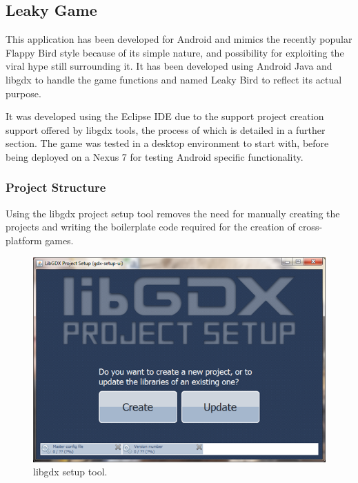 \newpage
\subsection{Leaky Game}
This application has been developed for Android and mimics the recently popular Flappy Bird style because of its simple nature, and possibility for exploiting the viral hype still surrounding it. It has been developed using Android Java and libgdx to handle the game functions and named Leaky Bird to reflect its actual purpose.

It was developed using the Eclipse IDE due to the support project creation support offered by libgdx tools, the process of which is detailed in a further section. The game was tested in a desktop environment to start with, before being deployed on a Nexus 7 for testing Android specific functionality.

\subsubsection{Project Structure}
Using the libgdx project setup tool removes the need for manually creating the projects and writing the boilerplate code required for the creation of cross-platform games. 

\begin{figure}[h!]
\centering\includegraphics[width=\linewidth]{implementation/figures/gdx-setup-1.png}
\caption{libgdx setup tool.}
\end{figure}

